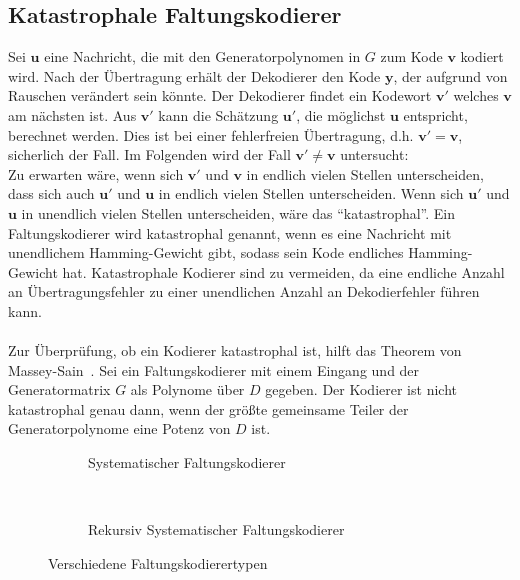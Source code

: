 \subsection{Katastrophale Faltungskodierer}
\label{kapitel:grundlagen_katastrophale_kodierer}
Sei $\mathbf{u}$ eine Nachricht, die mit den Generatorpolynomen in $G$ zum Kode $\mathbf{v}$ kodiert wird. Nach der Übertragung erhält der Dekodierer den Kode $\mathbf{y}$, der aufgrund von Rauschen verändert sein könnte. Der Dekodierer findet ein Kodewort $\mathbf{v'}$ welches $\mathbf{v}$ am nächsten ist. Aus $\mathbf{v'}$ kann die Schätzung $\mathbf{u'}$, die möglichst $\mathbf{u}$ entspricht, berechnet werden. Dies ist bei einer fehlerfreien Übertragung, d.h. $\mathbf{v'}=\mathbf{v}$, sicherlich der Fall. Im Folgenden wird der Fall $\mathbf{v'}\neq\mathbf{v}$ untersucht:\\
Zu erwarten wäre, wenn sich $\mathbf{v'}$ und $\mathbf{v}$ in endlich vielen Stellen unterscheiden, dass sich auch $\mathbf{u'}$ und $\mathbf{u}$ in endlich vielen Stellen unterscheiden. Wenn sich $\mathbf{u'}$ und $\mathbf{u}$ in unendlich vielen Stellen unterscheiden, wäre das \enquote{katastrophal}. Ein Faltungskodierer wird katastrophal genannt, wenn es eine Nachricht mit unendlichem Hamming-Gewicht gibt, sodass sein Kode endliches Hamming-Gewicht hat. Katastrophale Kodierer sind zu vermeiden, da eine endliche Anzahl an Übertragungsfehler zu einer unendlichen Anzahl an Dekodierfehler führen kann. \cite[S. 569]{huffman2010fundamentals}
\\
\\
Zur Überprüfung, ob ein Kodierer katastrophal ist, hilft das Theorem von Massey-Sain~\cite[S. 570]{huffman2010fundamentals}. Sei ein Faltungskodierer mit einem Eingang und der Generatormatrix $G$ als Polynome über $D$ gegeben. Der Kodierer ist nicht katastrophal genau dann, wenn der größte gemeinsame Teiler der Generatorpolynome eine Potenz von $D$ ist.
\begin{figure}[t]
	\centering
	\begin{subfigure}{0.45\textwidth}
		\centering
		\resizebox{0.90\textwidth}{!}{%
			
		}
		\caption{Systematischer Faltungskodierer}
		\label{abb:systematischer_kodierer}
	\end{subfigure}
	~ %
	\begin{subfigure}{0.45\textwidth}
		\centering
		\resizebox{0.99\textwidth}{!}{%
			
		}
		\caption{Rekursiv Systematischer Faltungskodierer}
		\label{abb:rsc_kodierer}
	\end{subfigure}
\caption{Verschiedene Faltungskodierertypen}
\label{abb:faltungskodierer_typen}
\end{figure}

